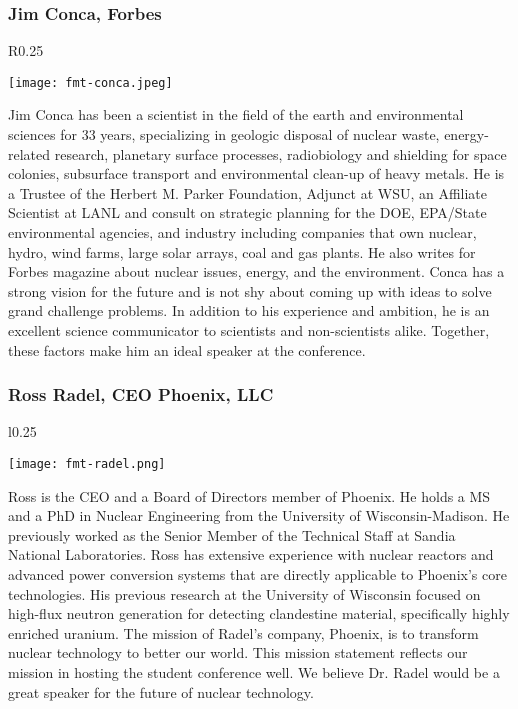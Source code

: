 \subsubsection{Jim Conca, Forbes}
\setlength\intextsep{0pt}
\begin{wrapfigure}{R}{0.25\textwidth}
	\begin{center}
		\texttt{[image: fmt-conca.jpeg]}
	\end{center}
\end{wrapfigure}
Jim Conca has been a scientist in the field of the earth and environmental sciences for 33 years, specializing in geologic disposal of nuclear waste, energy-related research, planetary surface processes, radiobiology and shielding for space colonies, subsurface transport and environmental clean-up of heavy metals. He is a Trustee of the Herbert M. Parker Foundation, Adjunct at WSU, an Affiliate Scientist at LANL and consult on strategic planning for the DOE, EPA/State environmental agencies, and industry including companies that own nuclear, hydro, wind farms, large solar arrays, coal and gas plants. He also writes for Forbes magazine about nuclear issues, energy, and the environment. Conca has a strong vision for the future and is not shy about coming up with ideas to solve grand challenge problems. In addition to his experience and ambition, he is an excellent science communicator to scientists and non-scientists alike. Together, these factors make him an ideal speaker at the conference.

\subsubsection{Ross Radel, CEO Phoenix, LLC}
\setlength\intextsep{0pt}
\begin{wrapfigure}{l}{0.25\textwidth}
	\begin{center}
		\texttt{[image: fmt-radel.png]}
	\end{center}
\end{wrapfigure}
Ross is the CEO and a Board of Directors member of Phoenix. He holds a MS and a PhD in Nuclear Engineering from the University of Wisconsin-Madison. He previously worked as the Senior Member of the Technical Staff at Sandia National Laboratories. Ross has extensive experience with nuclear reactors and advanced power conversion systems that are directly applicable to Phoenix’s core technologies. His previous research at the University of Wisconsin focused on high-flux neutron generation for detecting clandestine material, specifically highly enriched uranium. The mission of Radel's company, Phoenix, is to transform nuclear technology to better our world. This mission statement reflects our mission in hosting the student conference well. We believe Dr. Radel would be a great speaker for the future of nuclear technology.\\


